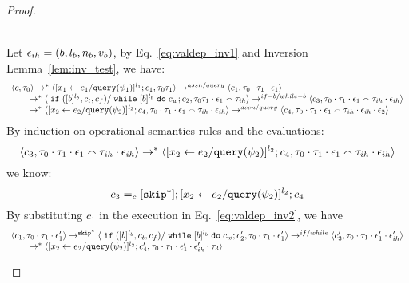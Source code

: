 \begin{proof}
\begin{case}
\begin{subcase}
\label{case:valdep_ihtest}
 \\
Let $\mathtt{\epsilon}_{ih} = (b, l_b, n_b, v_b)$, by Eq.~\ref{eq:valdep_inv1} and {Inversion Lemma~\ref{lem:inv_test}}, we have:
\begin{equation}
\label{eq:m1test_inv1}
  \begin{array}{l}   
\langle {c}, \mathtt{\tau}_0 \rangle \rightarrow^{*} 
\langle [\mathrel{ {x}_1 \leftarrow e_1 / {\tt query}(\psi_1) }]^{l_1} ; {c}_1, \mathtt{\tau}_0 \mathtt{\tau}_1 \rangle  
\rightarrow^{assn/query}
 \langle c_1, \mathtt{\tau}_0 \cdot \mathtt{\tau}_1 \cdot \mathtt{\epsilon}_1 \rangle 
 \\
  \qquad \rightarrow^{*} 
  \langle \;\mathtt{if}\; ([b]^{l_b}, c_t, c_f) / \;\mathtt{while}\; [b]^{l_b} \;\mathtt{do}\; c_w;{c}_2, 
  \mathtt{\tau}_0 \mathtt{\tau}_1 \cdot \mathtt{\epsilon}_1 \smallfrown \mathtt{\tau}_{ih} \rangle 
 \rightarrow^{if-b / while-b} 
  \langle c_3, 
  \mathtt{\tau}_0 \cdot \mathtt{\tau}_1 \cdot \mathtt{\epsilon}_1 \smallfrown \mathtt{\tau}_{ih} \cdot \mathtt{\epsilon}_{ih} \rangle 
  \\
  \qquad   \rightarrow^{*} 
  \langle [\mathrel{ {x}_2 \leftarrow e_2 / {\tt query}(\psi_2) }]^{l_2};{c}_4, 
  \mathtt{\tau}_0 \cdot \mathtt{\tau}_1 \cdot \mathtt{\epsilon}_1 \smallfrown \mathtt{\tau}_{ih} \cdot \mathtt{\epsilon}_{ih} \rangle 
  \rightarrow^{assn/query} 
  \langle {c}_4,  \mathtt{\tau}_0 \cdot \mathtt{\tau}_1 \cdot \mathtt{\epsilon}_1  \smallfrown \mathtt{\tau}_{ih} \cdot \mathtt{\epsilon}_{ih} \cdot \mathtt{\epsilon}_2 \rangle 
\end{array}
\end{equation}
 By induction on operational semantics rules and the evaluations: 
 \[
 \langle c_3, 
  \mathtt{\tau}_0 \cdot \mathtt{\tau}_1 \cdot \mathtt{\epsilon}_1 \smallfrown \mathtt{\tau}_{ih} \cdot \mathtt{\epsilon}_{ih} \rangle 
  \rightarrow^{*} 
  \langle [\mathrel{ {x}_2 \leftarrow e_2 / {\tt query}(\psi_2) }]^{l_2};{c}_4, 
  \mathtt{\tau}_0 \cdot \mathtt{\tau}_1 \cdot \mathtt{\epsilon}_1 \smallfrown \mathtt{\tau}_{ih} \cdot \mathtt{\epsilon}_{ih} \rangle 
 \]
 we know:
  \[
 c_3 =_c 
 [\mathtt{skip}^*]; [\mathrel{ {x}_2 \leftarrow e_2 / {\tt query}(\psi_2) }]^{l_2};{c}_4
 \]
By substituting $c_1$ in the execution in Eq.~\ref{eq:valdep_inv2}, we have 
\begin{equation}
\label{eq:m1test_inv2}
  \begin{array}{l}   
  \langle c_1, \mathtt{\tau}_0 \cdot \mathtt{\tau}_1 \cdot \mathtt{\epsilon}_1' \rangle 
  \rightarrow^{\mathtt{skip}^*} 
  \langle \;\mathtt{if}\; ([b]^{l_b}, c_t, c_f) / \;\mathtt{while}\; [b]^{l_b} \;\mathtt{do}\; c_w ; {c}_2', \mathtt{\tau}_0 \cdot \mathtt{\tau}_1 \cdot \mathtt{\epsilon}_1' \rangle 
  \rightarrow^{if / while} 
  \langle c_3', \mathtt{\tau}_0 \cdot \mathtt{\tau}_1 \cdot \mathtt{\epsilon}_1' \cdot \mathtt{\epsilon}_{ih}' \rangle 
  \\
  \qquad \rightarrow^{*} 
  \langle [\mathrel{ {x}_2 \leftarrow e_2 / {\tt query}(\psi_2) }]^{l_2};{c}_4', 
  \mathtt{\tau}_0 \cdot \mathtt{\tau}_1 \cdot \mathtt{\epsilon}_1' \cdot \mathtt{\epsilon}_{ih}' \cdot \mathtt{\tau}_3 \rangle

\end{array}
\end{equation}
\end{subcase}
\end{case}
\end{proof}
